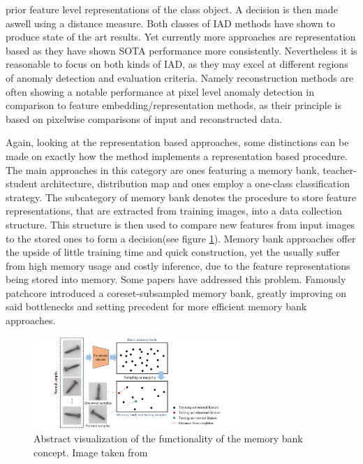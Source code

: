 prior feature level representations of the class object. A decision is then made aswell using a distance measure.\newline
Both classes of IAD methods have shown to produce state of the art results. Yet currently more approaches are representation based \cite{liu2024deep} as they have shown SOTA performance more 
consistently. Nevertheless it is reasonable to focus on both kinds of IAD, as they may excel at different regions of anomaly detection and evaluation criteria. Namely reconstruction methods are 
often showing a notable performance at pixel level anomaly detection in comparison to feature embedding/representation methods, as their principle is based on pixelwise comparisons of input 
and reconstructed data.
\newline


Again, looking at the representation based approaches, some distinctions can be made on exactly how the method implements a representation based procedure.
The main approaches in this category are ones featuring a memory bank, teacher-student architecture, distribution map and ones employ a one-class classification strategy. The subcategory of 
memory bank denotes the procedure to store feature representations, that are extracted from training images, into a data collection structure. This structure is then used to compare new 
features from input images to the stored ones to form a decision(see figure \ref{fig:memorybankviz}). Memory bank approaches offer the upside of little training time and quick construction, yet the usually suffer from high memory 
usage and costly inference, due to the feature representations being stored into memory. Some papers have addressed this problem. Famously patchcore \cite{patchCore2022} introduced a coreset-subsampled 
memory bank, greatly improving on said bottlenecks and setting precedent for more efficient memory bank approaches. \newline

\begin{figure}[H]
    \centering
    \includegraphics[width=0.7\textwidth]{figures/approachvizgeneral/memorybankviz.jpg}
    \caption{Abstract visualization of the functionality of the memory bank concept. Image taken from \cite{liu2024deep}}
    \label{fig:memorybankviz}
\end{figure}


